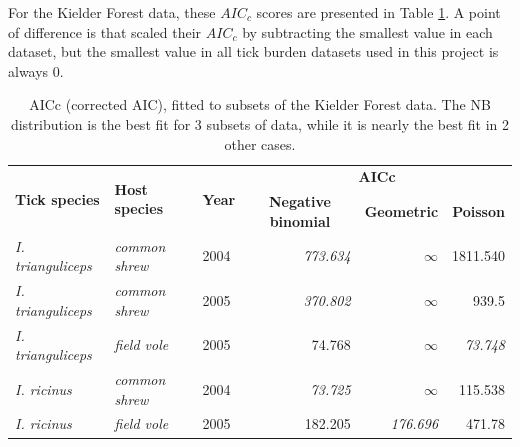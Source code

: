 \documentclass[hidelinks]{article}
\begin{document}
For the Kielder Forest data, these $ AIC_c $ scores are presented in Table \ref{tab:kielderAIC}. A point of difference is that  scaled their $AIC_c $ by subtracting the smallest value in each dataset, but the smallest value in all tick burden datasets used in this project is always $ 0 $.

\begin{table}[ht]
	\begin{mdframed}[backgroundcolor=grey250,rightline=false,leftline=false,topline=false]
	\centering
	\begin{tabular}{|l|l|l|rrr|}
		\hline
		\multirow{2}{*}{\textbf{Tick species}} & \multirow{2}{*}{\textbf{Host species}} & \multirow{2}{*}{\textbf{Year}} & \multicolumn{3}{c|}{\textbf{AICc}}                                                                                                \\ \cline{4-6} 
		&                                        &                                & \multicolumn{1}{c|}{\textbf{Negative binomial}} & \multicolumn{1}{c|}{\textbf{Geometric}} & \multicolumn{1}{c|}{\textbf{Poisson}} \\ \hline
		\textit{I. trianguliceps}              & \textit{common shrew}                  & 2004                           & \multicolumn{1}{r|}{\textit{773.634}}           & \multicolumn{1}{r|}{$\infty$}           & 1811.540                              \\ \hline
		\textit{I. trianguliceps}              & \textit{common shrew}                  & 2005                           & \multicolumn{1}{r|}{\textit{370.802}}           & \multicolumn{1}{r|}{$\infty$}           & 939.5                                 \\ \hline
		\textit{I. trianguliceps}              & \textit{field vole}                    & 2005                           & \multicolumn{1}{r|}{74.768}                     & \multicolumn{1}{r|}{$\infty$}           & \textit{73.748}                       \\ \hline
		\textit{I. ricinus}                    & \textit{common shrew}                  & 2004                           & \multicolumn{1}{r|}{\textit{73.725}}            & \multicolumn{1}{r|}{$\infty$}           & 115.538                               \\ \hline
		\textit{I. ricinus}                    & \textit{field vole}                    & 2005                           & \multicolumn{1}{r|}{182.205}                    & \multicolumn{1}{r|}{\textit{176.696}}   & 471.78                                \\ \hline
	\end{tabular}
	\caption{AICc (corrected AIC), fitted to subsets of the Kielder Forest data. The NB distribution is the best fit for 3 subsets of data, while it is nearly the best fit in 2 other cases.}
	\label{tab:kielderAIC}
	\end{mdframed}
\end{table}
\end{document}
